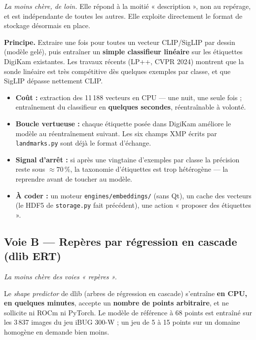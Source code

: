 \documentclass[11pt,a4paper]{article}
\begin{document}
\emph{La moins chère, de loin.} Elle répond à la moitié « description », non au
repérage, et est indépendante de toutes les autres. Elle exploite directement le
format de stockage désormais en place.

\textbf{Principe.} Extraire une fois pour toutes un vecteur CLIP/SigLIP par
dessin (modèle gelé), puis entraîner un \textbf{simple classifieur linéaire} sur
les étiquettes DigiKam existantes. Les travaux récents (LP++, CVPR 2024) montrent
que la sonde linéaire est très compétitive dès quelques exemples par classe, et
que SigLIP dépasse nettement CLIP.

\begin{itemize}[leftmargin=*,itemsep=3pt]
  \item \textbf{Coût :} extraction des 11\,188 vecteurs en CPU — une nuit, une
  seule fois ; entraînement du classifieur en \textbf{quelques secondes},
  réentraînable à volonté.
  \item \textbf{Boucle vertueuse :} chaque étiquette posée dans DigiKam améliore
  le modèle au réentraînement suivant. Les six champs XMP écrits par
  \texttt{landmarks.py} sont déjà le format d'échange.
  \item \textbf{Signal d'arrêt :} si après une vingtaine d'exemples par classe la
  précision reste sous $\approx 70\,\%$, la taxonomie d'étiquettes est trop
  hétérogène — la reprendre avant de toucher au modèle.
  \item \textbf{À coder :} un moteur \texttt{engines/embeddings/} (sans Qt), un
  cache des vecteurs (le HDF5 de \texttt{storage.py} fait précédent), une action
  « proposer des étiquettes ».
\end{itemize}

\subsection{Voie B — Repères par régression en cascade (dlib ERT)}

\emph{La moins chère des voies « repères ».}

Le \emph{shape predictor} de dlib (arbres de régression en cascade) s'entraîne
\textbf{en CPU, en quelques minutes}, accepte un \textbf{nombre de points
arbitraire}, et ne sollicite ni ROCm ni PyTorch. Le modèle de référence à
68 points est entraîné sur les 3\,837 images du jeu iBUG 300-W ; un jeu de 5 à
15 points sur un domaine homogène en demande bien moins.
\end{document}
